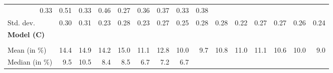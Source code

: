 \begin{tabular}{lllllllllllllll}
  \multicolumn{1}{r}{0.33} &
  \multicolumn{1}{r}{0.51} &
  \multicolumn{1}{r}{0.33} &
  \multicolumn{1}{r}{0.46} &
  \multicolumn{1}{r}{0.27} &
  \multicolumn{1}{r}{0.36} &
  \multicolumn{1}{r}{0.37} &
  \multicolumn{1}{r}{0.33} &
  \multicolumn{1}{r}{0.38} \\
\multicolumn{1}{l}{\hspace{2em}Std. dev.} &
  \multicolumn{1}{|r}{0.30} &
  \multicolumn{1}{r}{0.31} &
  \multicolumn{1}{r}{0.23} &
  \multicolumn{1}{r}{0.28} &
  \multicolumn{1}{r}{0.23} &
  \multicolumn{1}{r}{0.27} &
  \multicolumn{1}{r}{0.25} &
  \multicolumn{1}{r}{0.28} &
  \multicolumn{1}{r}{0.28} &
  \multicolumn{1}{r}{0.22} &
  \multicolumn{1}{r}{0.27} &
  \multicolumn{1}{r}{0.27} &
  \multicolumn{1}{r}{0.26} &
  \multicolumn{1}{r}{0.24} \\
\multicolumn{1}{l}{{\textbf{Model (C)}}} &
  \multicolumn{1}{|r}{} &
  \multicolumn{1}{r}{} &
  \multicolumn{1}{r}{} &
  \multicolumn{1}{r}{} &
  \multicolumn{1}{r}{} &
  \multicolumn{1}{r}{} &
  \multicolumn{1}{r}{} &
  \multicolumn{1}{r}{} &
  \multicolumn{1}{r}{} &
  \multicolumn{1}{r}{} &
  \multicolumn{1}{r}{} &
  \multicolumn{1}{r}{} &
  \multicolumn{1}{r}{} &
  \multicolumn{1}{r}{} \\
\multicolumn{1}{l}{\hspace{1em}{\textit{Additive term} ($\widehat{t}^{add}/\widetilde{p}$)}} &
  \multicolumn{1}{|r}{} &
  \multicolumn{1}{r}{} &
  \multicolumn{1}{r}{} &
  \multicolumn{1}{r}{} &
  \multicolumn{1}{r}{} &
  \multicolumn{1}{r}{} &
  \multicolumn{1}{r}{} &
  \multicolumn{1}{r}{} &
  \multicolumn{1}{r}{} &
  \multicolumn{1}{r}{} &
  \multicolumn{1}{r}{} &
  \multicolumn{1}{r}{} &
  \multicolumn{1}{r}{} &
  \multicolumn{1}{r}{} \\
\multicolumn{1}{l}{\hspace{2em}Mean (in $\%$)} &
  \multicolumn{1}{|r}{14.4} &
  \multicolumn{1}{r}{14.9} &
  \multicolumn{1}{r}{14.2} &
  \multicolumn{1}{r}{15.0} &
  \multicolumn{1}{r}{11.1} &
  \multicolumn{1}{r}{12.8} &
  \multicolumn{1}{r}{10.0} &
  \multicolumn{1}{r}{9.7} &
  \multicolumn{1}{r}{10.8} &
  \multicolumn{1}{r}{11.0} &
  \multicolumn{1}{r}{11.1} &
  \multicolumn{1}{r}{10.6} &
  \multicolumn{1}{r}{10.0} &
  \multicolumn{1}{r}{9.0} \\
\multicolumn{1}{l}{\hspace{2em}Median (in $\%$)} &
  \multicolumn{1}{|r}{9.5} &
  \multicolumn{1}{r}{10.5} &
  \multicolumn{1}{r}{8.4} &
  \multicolumn{1}{r}{8.5} &
  \multicolumn{1}{r}{6.7} &
  \multicolumn{1}{r}{7.2} &
  \multicolumn{1}{r}{6.7} &

\end{tabular}
